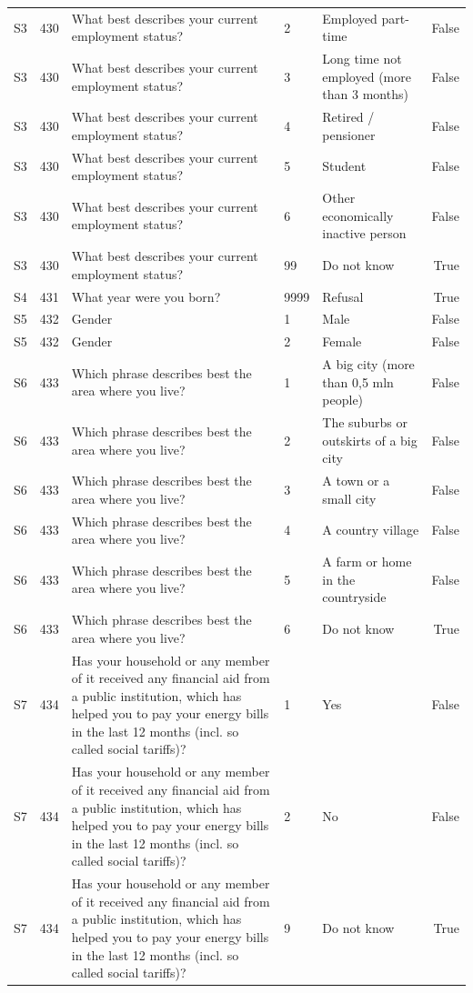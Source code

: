\begin{tabular}{lrlllr}
S3 & 430 & What best describes your current employment status? & 2 & Employed part-time & False \\
S3 & 430 & What best describes your current employment status? & 3 & Long time not employed (more than 3 months) & False \\
S3 & 430 & What best describes your current employment status? & 4 & Retired / pensioner & False \\
S3 & 430 & What best describes your current employment status? & 5 & Student & False \\
S3 & 430 & What best describes your current employment status? & 6 & Other economically inactive person & False \\
S3 & 430 & What best describes your current employment status? & 99 & Do not know & True \\
S4 & 431 & What year were you born? & 9999 & Refusal & True \\
S5 & 432 & Gender & 1 & Male & False \\
S5 & 432 & Gender & 2 & Female & False \\
S6 & 433 & Which phrase describes best the area where you live? & 1 & A big city (more than 0,5 mln people) & False \\
S6 & 433 & Which phrase describes best the area where you live? & 2 & The suburbs or outskirts of a big city & False \\
S6 & 433 & Which phrase describes best the area where you live? & 3 & A town or a small city & False \\
S6 & 433 & Which phrase describes best the area where you live? & 4 & A country village & False \\
S6 & 433 & Which phrase describes best the area where you live? & 5 & A farm or home in the countryside & False \\
S6 & 433 & Which phrase describes best the area where you live? & 6 & Do not know & True \\
S7 & 434 & Has your household or any member of it received any financial aid from a public institution, which has helped you to pay your energy bills in the last 12 months (incl. so called social tariffs)? & 1 & Yes & False \\
S7 & 434 & Has your household or any member of it received any financial aid from a public institution, which has helped you to pay your energy bills in the last 12 months (incl. so called social tariffs)? & 2 & No & False \\
S7 & 434 & Has your household or any member of it received any financial aid from a public institution, which has helped you to pay your energy bills in the last 12 months (incl. so called social tariffs)? & 9 & Do not know & True \\

\end{tabular}
